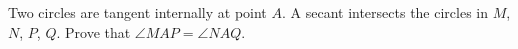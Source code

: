 Two circles are tangent internally at point $A$. A secant intersects the circles in $M$, $N$, $P$, $Q$. Prove that $\angle MAP = \angle NAQ$.
